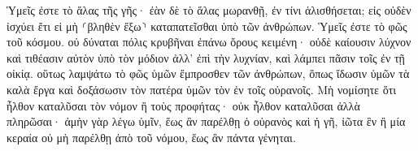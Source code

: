 \documentclass{openreader}
\begin{document}
Ὑμεῖς ἐστε τὸ ἅλας τῆς γῆς· ἐὰν δὲ τὸ ἅλας μωρανθῇ, ἐν τίνι ἁλισθήσεται; εἰς οὐδὲν ἰσχύει ἔτι εἰ μὴ ⸂βληθὲν ἔξω⸃ καταπατεῖσθαι ὑπὸ τῶν ἀνθρώπων. 
Ὑμεῖς ἐστε τὸ φῶς τοῦ κόσμου. οὐ δύναται πόλις κρυβῆναι ἐπάνω ὄρους κειμένη· 
οὐδὲ καίουσιν λύχνον καὶ τιθέασιν αὐτὸν ὑπὸ τὸν μόδιον ἀλλ’ ἐπὶ τὴν λυχνίαν, καὶ λάμπει πᾶσιν τοῖς ἐν τῇ οἰκίᾳ. 
οὕτως λαμψάτω τὸ φῶς ὑμῶν ἔμπροσθεν τῶν ἀνθρώπων, ὅπως ἴδωσιν ὑμῶν τὰ καλὰ ἔργα καὶ δοξάσωσιν τὸν πατέρα ὑμῶν τὸν ἐν τοῖς οὐρανοῖς. 
Μὴ νομίσητε ὅτι ἦλθον καταλῦσαι τὸν νόμον ἢ τοὺς προφήτας· οὐκ ἦλθον καταλῦσαι ἀλλὰ πληρῶσαι· 
ἀμὴν γὰρ λέγω ὑμῖν, ἕως ἂν παρέλθῃ ὁ οὐρανὸς καὶ ἡ γῆ, ἰῶτα ἓν ἢ μία κεραία οὐ μὴ παρέλθῃ ἀπὸ τοῦ νόμου, ἕως ἂν πάντα γένηται. 
\end{document}
